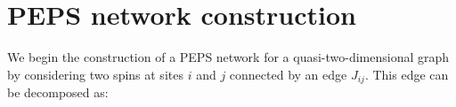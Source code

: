 

\section{PEPS network construction}
We begin the construction of a PEPS network for a quasi-two-dimensional graph
by considering two spins at sites $i$ and $j$ connected by an edge $J_{ij}$.
This edge can be decomposed as:

